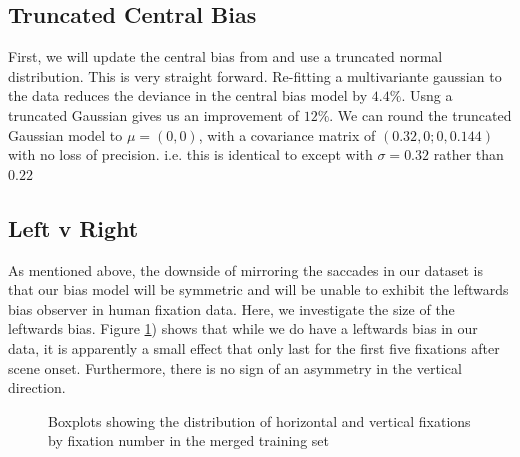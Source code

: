 \subsection{Truncated Central Bias}
\label{sec:truncatedCentral}

First, we will update the central bias from \cite{clarke-tatler2014} and use a truncated normal distribution. This is very straight forward. Re-fitting a multivariante gaussian to the data reduces the deviance in the central bias model by $4.4\%$. Usng a truncated Gaussian gives us an improvement of $12\%$. We can round the truncated Gaussian model to $\mu = (0,0)$, with a covariance matrix of $(0.32, 0; 0, 0.144)$ with no loss of precision. i.e. this is identical to \cite{clarke-tatler2014} except with $\sigma=0.32$ rather than $0.22$

\subsection{Left v Right}
\label{sec:LeftRight}

As mentioned above, the downside of mirroring the saccades in our dataset is that our bias model will be symmetric and will be unable to exhibit the leftwards bias observer in human fixation data. Here, we investigate the size of the leftwards bias. Figure \ref{fig:leftrightDist}) shows that while we do have a leftwards bias in our data, it is apparently a small effect that only last for the first five fixations after scene onset. Furthermore, there is no sign of an asymmetry in the vertical direction.

\begin{figure}
\centering
{}
\caption{Boxplots showing the distribution of horizontal and vertical fixations by fixation number in the merged training set}
\label{fig:leftrightDist}
\end{figure}

